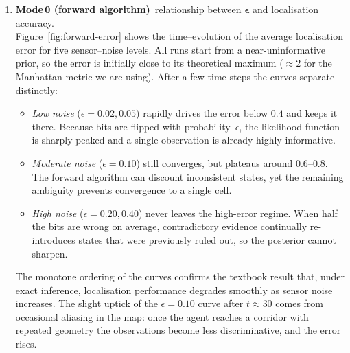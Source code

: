 \documentclass[11pt]{article}
\begin{document}
\begin{enumerate}
  \item \textbf{Mode\,0 (forward algorithm)}\textemdash\ relationship between
        $\boldsymbol{\epsilon}$ and localisation accuracy.\\[2pt]
        \sloppy
        Figure~\ref{fig:forward-error} shows the time–evolution of the average localisation
        error for five sensor–noise levels.  All runs start from a near-uninformative
        prior, so the error is initially close to its theoretical maximum
        ($\approx 2$ for the Manhattan metric we are using).  After a few
        time-steps the curves separate distinctly:

        \begin{itemize}
          \item \emph{Low noise} ($\epsilon=0.02,0.05$) rapidly drives the error below
                $0.4$ and keeps it there.  Because bits are flipped with
                probability~$\epsilon$, the likelihood function is sharply
                peaked and a single observation is already highly informative.
          \item \emph{Moderate noise} ($\epsilon=0.10$) still converges, but
                plateaus around $0.6$--$0.8$.  The forward algorithm can
                discount inconsistent states, yet the remaining ambiguity
                prevents convergence to a single cell.
          \item \emph{High noise} ($\epsilon=0.20,0.40$) never leaves the
                high-error regime.  When half the bits are wrong on average,
                contradictory evidence continually re-introduces states that
                were previously ruled out, so the posterior cannot sharpen.
        \end{itemize}

        The monotone ordering of the curves confirms the textbook result that,
        under exact inference, localisation performance degrades smoothly as
        sensor noise increases.  The slight uptick of the $\epsilon=0.10$ curve
        after $t\!\approx\!30$ comes from occasional aliasing in the map: once
        the agent reaches a corridor with repeated geometry the observations
        become less discriminative, and the error rises.


\end{enumerate}
\end{document}
